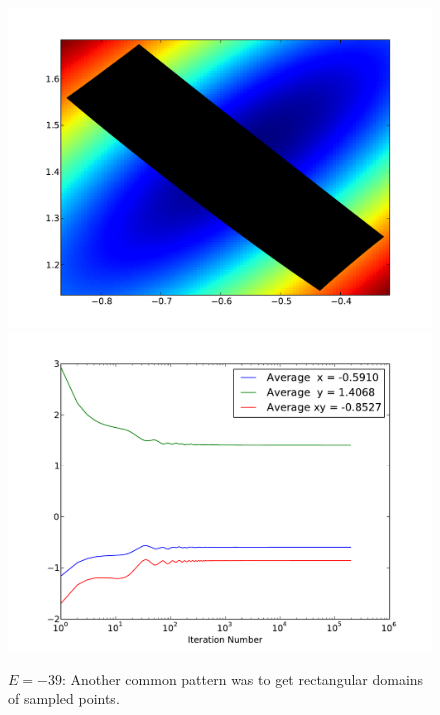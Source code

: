 \documentclass[letterpaper]{article}
\begin{document}
\begin{figure}[p]
\begin{center}
\includegraphics[width=5in]{t3.pdf}
\includegraphics[width=5in]{t3a.pdf}
\end{center}
\caption{$E=-39$: Another common pattern was to get rectangular domains of
sampled points. }
\label{fig:t3}
\end{figure}
\end{document}
